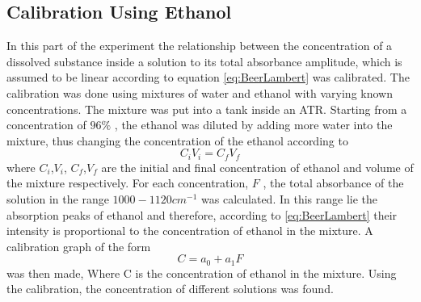 \documentclass[reprint,amsmath,amssymb,aps, prl,superscriptaddress]{revtex4-2}
\begin{document}
\subsection{Calibration Using Ethanol} 
In this part of the experiment the relationship between the concentration of a dissolved substance inside a solution
to its total absorbance amplitude, which is assumed to be linear according to equation \ref{eq:BeerLambert} was calibrated. The calibration was done using mixtures of water and ethanol  with varying known concentrations. The mixture was put into a tank inside an ATR. Starting from a concentration of $96\%$ , the ethanol was diluted by adding more water into the mixture, thus changing the concentration of the ethanol according to 
\begin{equation} \label{eq:EthanolConcentrVolume}
C_{i}V_{i} = C_{f}V_{f}
\end{equation}
where $C_{i}$,$V_{i}$, $C_{f}$,$V_{f}$ are the initial and final concentration of ethanol and volume of the mixture respectively. 
For each concentration, $F$ , the total absorbance of the solution in the range $1000-1120 cm^{-1}$ was calculated. In this range lie the absorption peaks of ethanol \cite{NISTwebook} and therefore, according to \ref{eq:BeerLambert} their intensity is proportional to the concentration of ethanol in the mixture. A calibration graph of the form 
\begin{equation} \label{eq:EthanolLinFit}
    C=a_{0}+a_{1}F 
\end{equation} 
was then made, Where C is the concentration of ethanol in the mixture. Using the calibration, the concentration of different solutions was found. 
\end{document}
